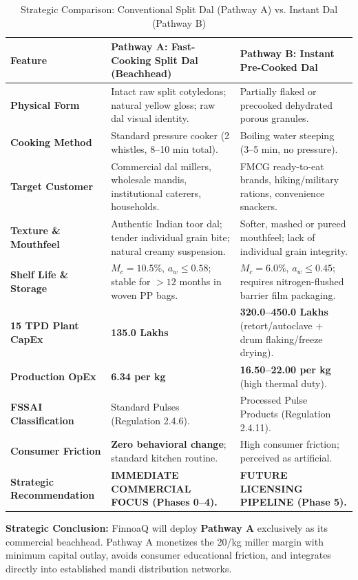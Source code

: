 \documentclass[10pt,a4paper]{article}
\newcommand{\inr}{\text{INR~}}
\begin{document}
\begin{table}[H]
\centering
\small
\caption{Strategic Comparison: Conventional Split Dal (Pathway A) vs. Instant Dal (Pathway B)}
\label{tab:pathway_comparison}
\begin{tabularx}{\linewidth}{p{3.2cm}Xp{4.8cm}}
\toprule
\textbf{Feature} & \textbf{Pathway A: Fast-Cooking Split Dal (Beachhead)} & \textbf{Pathway B: Instant Pre-Cooked Dal} \\
\midrule
\textbf{Physical Form} & Intact raw split cotyledons; natural yellow gloss; raw dal visual identity. & Partially flaked or precooked dehydrated porous granules. \\
\textbf{Cooking Method} & Standard pressure cooker (2 whistles, 8--10 min total). & Boiling water steeping (3--5 min, no pressure). \\
\textbf{Target Customer} & Commercial dal millers, wholesale mandis, institutional caterers, households. & FMCG ready-to-eat brands, hiking/military rations, convenience snackers. \\
\textbf{Texture \& Mouthfeel} & Authentic Indian toor dal; tender individual grain bite; natural creamy suspension. & Softer, mashed or pureed mouthfeel; lack of individual grain integrity. \\
\textbf{Shelf Life \& Storage} & $M_c = 10.5\%$, $a_w \le 0.58$; stable for $> 12$ months in woven PP bags. & $M_c = 6.0\%$, $a_w \le 0.45$; requires nitrogen-flushed barrier film packaging. \\
\textbf{15 TPD Plant CapEx} & \textbf{\inr 135.0 Lakhs} & \textbf{\inr 320.0--450.0 Lakhs} (retort/autoclave + drum flaking/freeze drying). \\
\textbf{Production OpEx} & \textbf{\inr 6.34 per kg} & \textbf{\inr 16.50--22.00 per kg} (high thermal duty). \\
\textbf{FSSAI Classification} & Standard Pulses (Regulation 2.4.6). & Processed Pulse Products (Regulation 2.4.11). \\
\textbf{Consumer Friction} & \textbf{Zero behavioral change}; standard kitchen routine. & High consumer friction; perceived as artificial. \\
\textbf{Strategic Recommendation} & \textbf{IMMEDIATE COMMERCIAL FOCUS (Phases 0--4).} & \textbf{FUTURE LICENSING PIPELINE (Phase 5).} \\
\bottomrule
\end{tabularx}
\end{table}

\noindent\textbf{Strategic Conclusion:} FinnoaQ will deploy \textbf{Pathway A} exclusively as its commercial beachhead. Pathway A monetizes the \inr 20/kg miller margin with minimum capital outlay, avoids consumer educational friction, and integrates directly into established mandi distribution networks.
\end{document}
